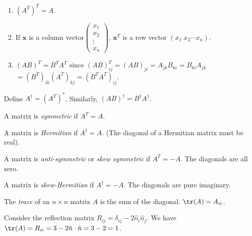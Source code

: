 \documentclass[a4paper]{article}
\begin{document}
\begin{prop}\leavevmode
  \begin{enumerate}
    \item $(A^T)^T = A$.
    \item If $\mathbf{x}$ is a column vector$\begin{pmatrix}x_1\\x_2\\\vdots\\x_n\end{pmatrix}$, $\mathbf{x}^T$ is a row vector $(x_1\; x_2\cdots x_n)$.
    \item $(AB)^T = B^TA^T$ since $(AB)^T_{ij} = (AB)_{ji} = A_{jk}B_{ki} = B_{ki}A_{jk} $\\$= (B^T)_{ik}(A^T)_{kj} = (B^TA^T)_{ij}$.
  \end{enumerate}
\end{prop}

\begin{defi}
  Define $A^{\dagger} = (A^T)^*$. Similarly, $(AB)^\dagger = B^\dagger A^\dagger$.
\end{defi}

\begin{defi}
  A matrix is \emph{symmetric} if $A^T = A$.
\end{defi}

\begin{defi}
  A matrix is \emph{Hermitian} if $A^\dagger = A$. (The diagonal of a Hermitian matrix must be real).
\end{defi}

\begin{defi}
  A matrix is \emph{anti-symmetric} or \emph{skew symmetric} if $A^T = -A$. The diagonals are all zero.
\end{defi}

\begin{defi}
  A matrix is \emph{skew-Hermitian} if $A^\dagger = -A$. The diagonals are pure imaginary.
\end{defi}

\begin{defi}
  The \emph{trace} of an $n\times n$ matrix $A$ is the sum of the diagonal. $\tr(A) = A_{ii}$.
\end{defi}

\begin{eg}
  Consider the reflection matrix $R_{ij} = \delta_{ij} - 2\hat n_i \hat n_j$. We have $\tr(A) = R_{ii} = 3 - 2\hat{n}\cdot \hat{n} = 3 - 2 = 1$.
\end{eg}
\end{document}
